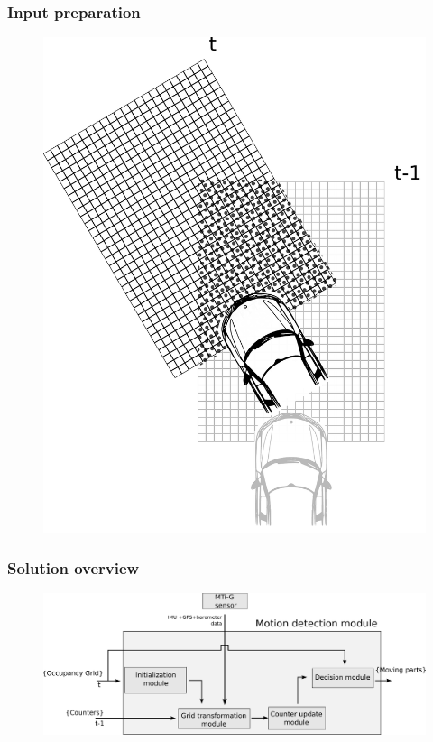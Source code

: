 \documentclass{beamer}
\begin{document}
	\begin{frame}
		\frametitle{Input preparation}
		\begin{figure}[h]
			\center
			\includegraphics[scale=0.2]{../img/fig:motion:algorithm:nonstatic:01}
		\end{figure}
	
	\end{frame}


	\begin{frame}
		\frametitle{Solution overview}
		\begin{figure}[h]
			\center
			\includegraphics[scale=0.30]{../img/fig:motion:framework:motionmodule}
		 \end{figure}
		
	\end{frame}		
	
\end{document}
